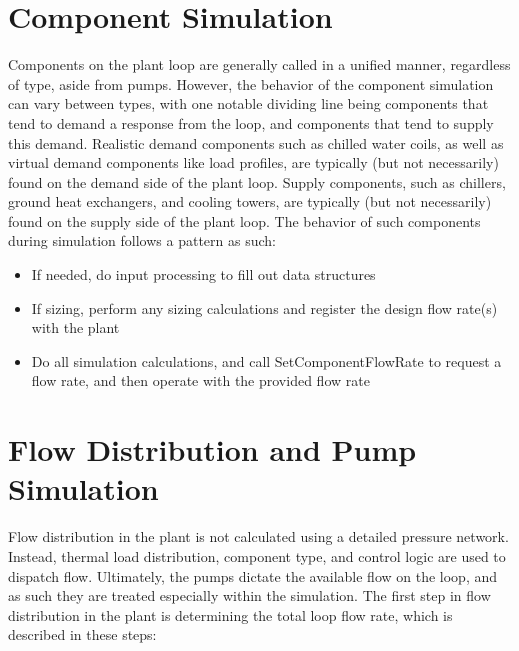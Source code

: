 \documentclass{report}
\begin{document}
    \section{Component Simulation}\label{sec:modeling-component}

    Components on the plant loop are generally called in a unified manner, regardless of type, aside from pumps.
    However, the behavior of the component simulation can vary between types, with one notable dividing line being components that tend to demand a response from the loop, and components that tend to supply this demand.
    Realistic demand components such as chilled water coils, as well as virtual demand components like load profiles, are typically (but not necessarily) found on the demand side of the plant loop.
    Supply components, such as chillers, ground heat exchangers, and cooling towers, are typically (but not necessarily) found on the supply side of the plant loop.
    The behavior of such components during simulation follows a pattern as such:
    \begin{itemize}
        \item If needed, do input processing to fill out data structures
        \item If sizing, perform any sizing calculations and register the design flow rate(s) with the plant
        \item Do all simulation calculations, and call SetComponentFlowRate to request a flow rate, and then operate with the provided flow rate
    \end{itemize}

    \section{Flow Distribution and Pump Simulation}\label{sec:modeling-flow}

    Flow distribution in the plant is not calculated using a detailed pressure network.
    Instead, thermal load distribution, component type, and control logic are used to dispatch flow.
    Ultimately, the pumps dictate the available flow on the loop, and as such they are treated especially within the simulation.
    The first step in flow distribution in the plant is determining the total loop flow rate, which is described in these steps:
\end{document}
